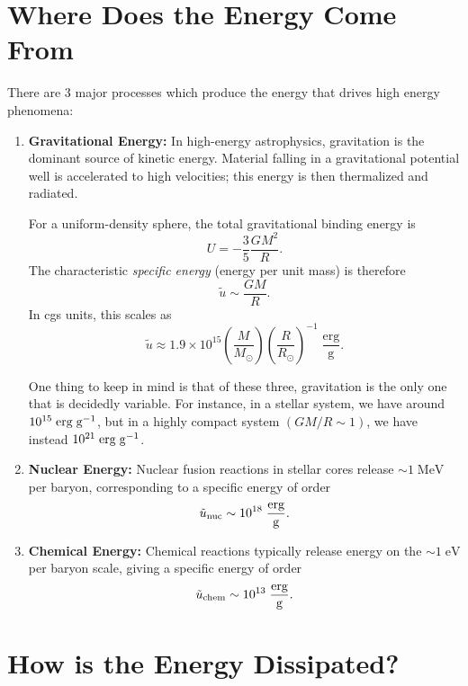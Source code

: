 \section{Where Does the Energy Come From}

There are 3 major processes which produce the energy that drives high energy phenomena:
\vspace{0.5cm}
\begin{enumerate}
    \item \textbf{Gravitational Energy:}  
    In high-energy astrophysics, gravitation is the dominant source of kinetic energy. Material falling in a gravitational potential well is accelerated to high velocities; this energy is then thermalized and radiated.  

    For a uniform-density sphere, the total gravitational binding energy is
    \[
        U = -\frac{3}{5}\frac{GM^2}{R}.
    \]
    The characteristic \textit{specific energy} (energy per unit mass) is therefore
    \[
        \tilde{u} \sim \frac{GM}{R}.
    \]
    In cgs units, this scales as
    \[
        \tilde{u} \approx 1.9 \times 10^{15}
        \left(\frac{M}{M_\odot}\right)
        \left(\frac{R}{R_\odot}\right)^{-1}
        \;\mathrm{\frac{erg}{g}}.
    \]
    \begin{remark}
        One thing to keep in mind is that of these three, gravitation is the only one that is decidedly variable. For instance, in a stellar system, we have around $10^{15}\;{\rm erg \;g^{-1}}$, but in a highly compact system $(GM/R \sim 1)$, we have instead $10^{21}\;{\rm erg\;g^{-1}}$.
    \end{remark}
    \item \textbf{Nuclear Energy:}  
    Nuclear fusion reactions in stellar cores release $\sim 1\;\mathrm{MeV}$ per baryon, corresponding to a specific energy of order
    \[
        \tilde{u}_{\rm nuc} \sim 10^{18}\;\mathrm{\frac{erg}{g}}.
    \]

    \item \textbf{Chemical Energy:}  
    Chemical reactions typically release energy on the $\sim 1\;\mathrm{eV}$ per baryon scale, giving a specific energy of order
    \[
        \tilde{u}_{\rm chem} \sim 10^{13}\;\mathrm{\frac{erg}{g}}.
    \]
\end{enumerate}

\section{How is the Energy Dissipated?}


